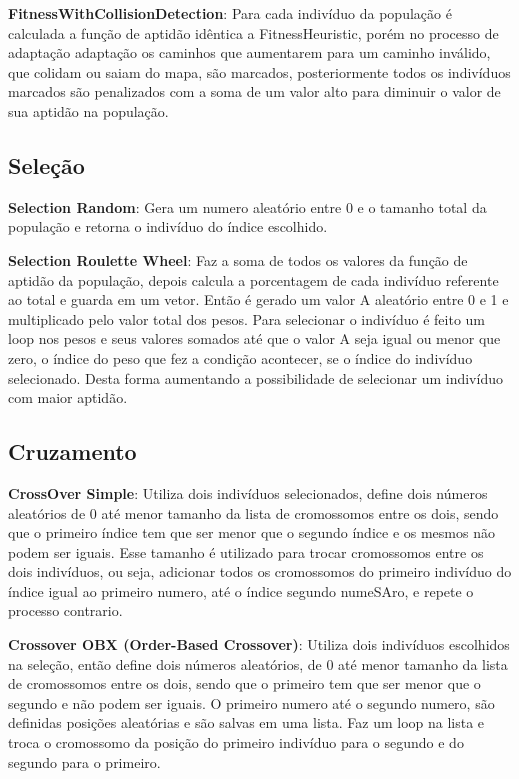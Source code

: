\textbf{FitnessWithCollisionDetection}: Para cada indivíduo da população é calculada a função de aptidão idêntica a FitnessHeuristic, porém no processo de adaptação adaptação os caminhos que aumentarem para um caminho inválido, que colidam ou saiam do mapa, são marcados,
posteriormente todos os indivíduos marcados são penalizados com a  soma de  um valor alto para diminuir o valor de sua aptidão na população.

\subsection{Seleção}

\textbf{Selection Random}: Gera um numero aleatório entre 0 e o tamanho total da população e retorna o indivíduo do índice escolhido.

\textbf{Selection Roulette Wheel}: Faz a soma de todos os valores da função de aptidão da população, depois calcula a porcentagem de cada indivíduo referente ao total 
e guarda em um vetor. Então é gerado um valor A aleatório entre 0 e 1 e multiplicado pelo valor total dos pesos. Para selecionar o indivíduo é feito um loop 
nos pesos e seus valores somados até que o valor A seja igual ou menor que zero, o índice do peso que fez a condição acontecer, se o índice do indivíduo selecionado.
Desta forma aumentando a possibilidade de selecionar um indivíduo com maior aptidão.

\subsection{Cruzamento}

\textbf{CrossOver Simple}: Utiliza dois indivíduos selecionados,  define dois números aleatórios de 0 até menor tamanho da lista de cromossomos entre os dois, 
sendo que o primeiro índice tem que ser menor que o segundo índice e os mesmos não podem ser iguais. 
Esse tamanho é utilizado para trocar cromossomos entre os dois indivíduos, ou seja, adicionar todos os cromossomos do primeiro indivíduo do índice 
igual ao primeiro numero, até o índice segundo numeSAro, e repete o processo contrario.

\textbf{Crossover OBX (Order-Based Crossover)}: Utiliza dois indivíduos escolhidos na seleção, então define dois números aleatórios, de 0 até menor tamanho da lista de cromossomos entre os dois, sendo que o primeiro tem que ser menor que o segundo e não podem ser iguais. O primeiro numero até o segundo numero, são definidas posições aleatórias e são salvas em uma lista. Faz um loop na lista e troca o cromossomo da posição do primeiro indivíduo para o segundo e do segundo para o primeiro.

